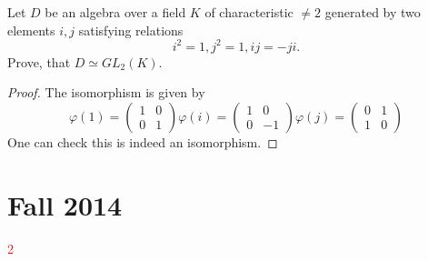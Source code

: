 \documentclass[openany]{book}
\begin{document}
\begin{prob}
    Let \(D\) be an algebra over a field \(K\) of characteristic \(\neq 2\) generated by two elements \(i,j\) satisfying relations
    \[i^{2}=1, j^{2}=1, ij=-ji.\]
    Prove, that \(D\simeq GL_{2}(K)\).
\end{prob}
\begin{proof}
    The isomorphism is given by 
    \begin{equation*}
        \varphi(1)=\begin{pmatrix}
            1&0\\
            0&1
        \end{pmatrix}
        \varphi(i)=\begin{pmatrix}
            1&0\\
            0&-1
        \end{pmatrix}
        \varphi(j)=\begin{pmatrix}
            0&1\\
            1&0
        \end{pmatrix}
    \end{equation*}
    One can check this is indeed an isomorphism.
\end{proof}




\chapter{Fall 2014}


\textcolor{red}{2}
\end{document}
